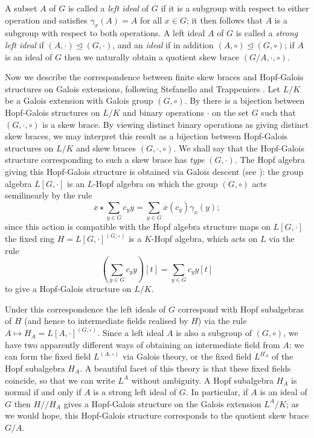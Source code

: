 \documentclass[12pt,a4paper, reqno]{amsart}
\theoremstyle{definition}
\begin{document}
A subset $ A $ of $ G $ is called a \textit{left ideal} of $ G $ if it is a subgroup with respect to either operation and satisfies $ \gamma_{x}(A)=A $ for all $ x \in G $; it then follows that $ A $ is a subgroup with respect to both operations. A left ideal $ A $ of $ G $ is called a \textit{strong left ideal} if 
$ (A,\cdot) \trianglelefteq (G,\cdot) $, and an \textit{ideal} if in addition $ (A,\circ) \trianglelefteq (G,\circ) $; if $ A $ is an ideal of $ G $ then we naturally obtain a quotient skew brace $ (G/A, \cdot, \circ) $. 

Now we describe the correspondence between finite skew braces and Hopf-Galois structures on Galois extensions, following Stefanello and Trappeniers \cite{ST23}. Let $ L/K $ be a Galois extension with Galois group $ (G,\circ) $. By \cite[Theorem 3.1]{ST23} there is a bijection between Hopf-Galois structures on $ L/K $ and binary operations $ \cdot $ on the set $ G $ such that $ (G,\cdot,\circ) $ is a skew brace. By viewing distinct binary operations as giving distinct skew braces, we may interpret this result as a bijection between Hopf-Galois structures on $ L/K $ and skew braces $ (G,\cdot,\circ) $. We shall say that the Hopf-Galois structure corresponding to such a skew brace has \textit{type} $ (G,\cdot) $. The Hopf algebra giving this Hopf-Galois structure is obtained via Galois descent (see \cite[Section 2.1]{ST23}): the group algebra $ L[G,\cdot] $ is an $ L $-Hopf algebra on which the group $ (G,\circ) $ acts semilinearly by the rule
\begin{equation} \label{eqn_skew_brace_HGS_action}
x \star \sum_{y \in G} c_{y} y = \sum_{y \in G} x(c_{y}) \gamma_{x}(y); 
\end{equation}
since this action is compatible with the Hopf algebra structure maps on $ L[G,\cdot] $ the fixed ring $ H = L[G,\cdot]^{(G,\circ)} $ is a $ K $-Hopf algebra, which acts on $ L $ via the rule
\begin{equation} \label{eqn_skew_brace_HGS_action_on_L}
\left( \sum_{y \in G} c_{y} y \right) [t] = \sum_{y \in G} c_{y} y[t]
\end{equation}
to give a Hopf-Galois structure on $ L/K $. 

Under this correspondence the left ideals of $ G $ correspond with Hopf subalgebras of $ H $ (and hence to intermediate fields realised by $ H $) via the rule $ A \mapsto H_{A} = L[A,\cdot]^{(G,\circ)} $. Since a left ideal $ A $ is also a subgroup of $ (G,\circ) $, we have two apparently different ways of obtaining an intermediate field from $ A $: we can form the fixed field $ L^{(A,\circ)} $ via Galois theory, or the fixed field $ L^{H_{A}} $ of the Hopf subalgebra $ H_{A} $. A beautiful facet of this theory is that these fixed fields coincide, so that we can write $ L^{A} $ without ambiguity. A Hopf subalgebra $ H_{A} $ is normal if and only if $ A $ is a strong left ideal of $ G $. In particular, if $ A $ is an ideal of $ G $ then $ H//H_{A} $ gives a Hopf-Galois structure on the Galois extension $ L^{A}/K $; as we would hope, this Hopf-Galois structure corresponds to the quotient skew brace $ G/A $. 
\end{document}
